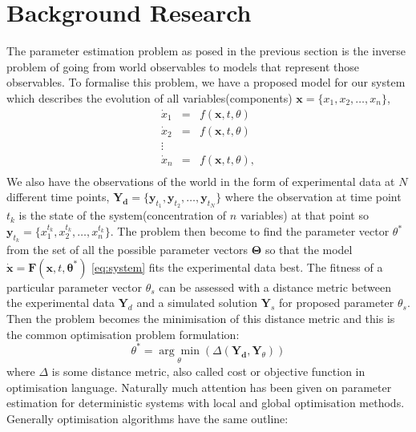 \documentclass[12pt,a4paper,titlepage]{article}
\begin{document}
\section{Background Research}
\label{sec:background}
The parameter estimation problem as posed in the previous section is the inverse problem of going from world observables to models that represent those observables. To formalise this problem, we have a proposed model for our system which describes the evolution of all variables(components) $\mathbf{x} = \{x_1, x_2, \dots, x_n\}$,
\begin{equation}
\label{eq:system}
\begin{array}{lcl}
\dot x_1 & = & f(\mathbf{x}, t, \theta) \\
\dot x_2& = & f(\mathbf{x}, t, \theta) \\
\vdots \\
\dot x_n & = & f(\mathbf{x}, t, \theta), \\
\end{array}
\end{equation}
We also have the observations of the world in the form of experimental data at $N$ different time points, $\mathbf{Y_d} = \{\mathbf{y}_{t_{1}},  \mathbf{y}_{t_{2}}, \dots, \mathbf{y}_{t_{N}}\}$ where the observation at time point $t_{k}$ is the state of the system(concentration of $n$ variables) at that point so 
$\mathbf{y}_{t_{k}} =\{ x_{1}^{t_{k}},  x_{2}^{t_{k}}, \dots,  x_{n}^{t_{k}} \}$. The problem then become to find the parameter vector $\theta^*$ from the set of all the possible parameter vectors $\mathbf{\Theta}$ so that the model $\mathbf{\dot x} = \mathbf{F}(\mathbf{x}, t, \mathbf{\theta^*})$  \ref{eq:system} fits the experimental data best. The fitness of a particular parameter vector $\theta_{s}$ can be assessed with a distance metric between the experimental data $\mathbf{Y}_{d}$ and a simulated solution $\mathbf{Y}_{s}$ for proposed parameter $\theta_{s}$. Then the problem becomes the minimisation of this distance metric and this is the common optimisation problem formulation: 
\begin{equation*}
\theta^* = \underset{\theta}{\arg\min}(\Delta(\mathbf{Y_{d}},\mathbf{Y}_{\theta})) 
\end{equation*}
where $\Delta$ is some distance metric, also called cost or objective function in optimisation language. Naturally much attention has been given on parameter estimation for deterministic systems with local and global optimisation methods\cite{Moles2003param}.  Generally optimisation algorithms have the same outline:
\end{document}

